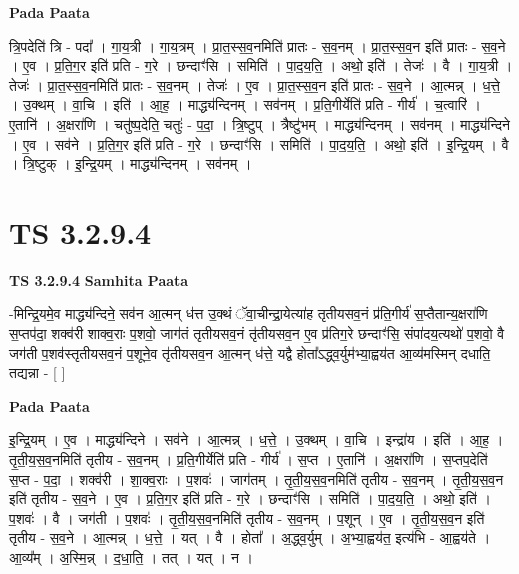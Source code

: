 \documentclass[17pt]{extarticle}
\begin{document}
\textbf{Pada Paata} \newline

त्रि॒पदेति॑ त्रि - पदा᳚ । गा॒य॒त्री । गा॒य॒त्रम् । प्रा॒त॒स्स॒व॒नमिति॑ प्रातः - स॒व॒नम् । प्रा॒त॒स्स॒व॒न इति॑ प्रातः - स॒व॒ने । ए॒व । प्र॒ति॒ग॒र इति॑ प्रति - ग॒रे । छन्दाꣳ॑सि । समिति॑ । पा॒द॒य॒ति॒ । अथो॒ इति॑ । तेजः॑ । वै । गा॒य॒त्री । तेजः॑ । प्रा॒त॒स्स॒व॒नमिति॑ प्रातः - स॒व॒नम् । तेजः॑ । ए॒व । प्रा॒त॒स्स॒व॒न इति॑ प्रातः - स॒व॒ने । आ॒त्मन्न् । ध॒त्ते॒ । उ॒क्थम् । वा॒चि । इति॑ । आ॒ह॒ । माद्ध्य॑न्दिनम् । सव॑नम् । प्र॒ति॒गीर्येति॑ प्रति - गीर्य॑ । च॒त्वारि॑ । ए॒तानि॑ । अ॒क्षरा॑णि । चतु॑ष्प॒देति॒ चतुः॑ - प॒दा॒ । त्रि॒ष्टुप् । त्रैष्टु॑भम् । माद्ध्य॑न्दिनम् । सव॑नम् । माद्ध्य॑न्दिने । ए॒व । सव॑ने । प्र॒ति॒ग॒र इति॑ प्रति - ग॒रे । छन्दाꣳ॑सि । समिति॑ । पा॒द॒य॒ति॒ । अथो॒ इति॑ । इ॒न्द्रि॒यम् । वै । त्रि॒ष्टुक् । इ॒न्द्रि॒यम् । माद्ध्य॑न्दिनम् । सव॑नम् ।  \newline





\section{ TS 3.2.9.4 }

\textbf{TS 3.2.9.4 } \newline
\textbf{Samhita Paata} \newline

-मिन्द्रि॒यमे॒व माद्ध्य॑न्दिने॒ सव॑न आ॒त्मन् ध॑त्त उ॒क्थं ॅवा॒चीन्द्रा॒येत्या॑ह तृतीयसव॒नं प्र॑ति॒गीर्य॑ स॒प्तैतान्य॒क्षरा॑णि स॒प्तप॑दा॒ शक्व॑री शाक्व॒राः प॒शवो॒ जाग॑तं तृतीयसव॒नं तृ॑तीयसव॒न ए॒व प्र॑तिग॒रे छन्दाꣳ॑सि॒ संपा॑दय॒त्यथो॑ प॒शवो॒ वै जग॑ती प॒शव॑स्तृतीयसव॒नं प॒शूने॒व तृ॑तीयसव॒न आ॒त्मन् ध॑त्ते॒ यद्वै होता᳚ऽद्ध्व॒र्युम॑भ्या॒ह्वय॑त आ॒व्य॑मस्मिन् दधाति॒ तद्यन्ना - [  ] \newline

\textbf{Pada Paata} \newline

इ॒न्द्रि॒यम् । ए॒व । माद्ध्य॑न्दिने । सव॑ने । आ॒त्मन्न् । ध॒त्ते॒ । उ॒क्थम् । वा॒चि । इन्द्रा॑य । इति॑ । आ॒ह॒ । तृ॒ती॒य॒स॒व॒नमिति॑ तृतीय - स॒व॒नम् । प्र॒ति॒गीर्येति॑ प्रति - गीर्य॑ । स॒प्त । ए॒तानि॑ । अ॒क्षरा॑णि । स॒प्तप॒देति॑ स॒प्त - प॒दा॒ । शक्व॑री । शा॒क्व॒राः । प॒शवः॑ । जाग॑तम् । तृ॒ती॒य॒स॒व॒नमिति॑ तृतीय - स॒व॒नम् । तृ॒ती॒य॒स॒व॒न इति॑ तृतीय - स॒व॒ने । ए॒व । प्र॒ति॒ग॒र इति॑ प्रति - ग॒रे । छन्दाꣳ॑सि । समिति॑ । पा॒द॒य॒ति॒ । अथो॒ इति॑ । प॒शवः॑ । वै । जग॑ती । प॒शवः॑ । तृ॒ती॒य॒स॒व॒नमिति॑ तृतीय - स॒व॒नम् । प॒शून् । ए॒व । तृ॒ती॒य॒स॒व॒न इति॑ तृतीय - स॒व॒ने । आ॒त्मन्न् । ध॒त्ते॒ । यत् । वै । होता᳚ । अ॒द्ध्व॒र्युम् । अ॒भ्या॒ह्वय॑त॒ इत्य॑भि - आ॒ह्वय॑ते । आ॒व्य᳚म् । अ॒स्मि॒न्न् । द॒धा॒ति॒ । तत् । यत् । न ।  \newline
\end{document}
